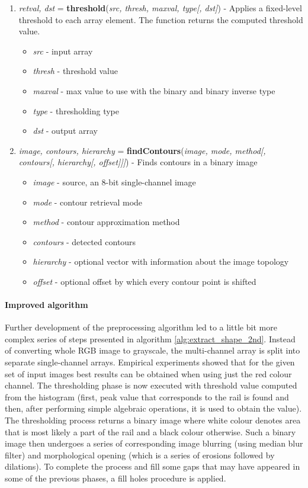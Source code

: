 \begin{enumerate}
	\item \textit{retval, dst} = \textbf{threshold}(\textit{src, thresh, maxval, type[, dst]}) - Applies a fixed-level threshold to each array element. The function returns the computed threshold value. \small{\begin{itemize}
		\item \textit{src} - input array
		\item \textit{thresh} - threshold value
		\item \textit{maxval} - max value to use with the binary and binary inverse type
		\item \textit{type} - thresholding type
		\item \textit{dst} - output array
	\end{itemize}}
	\item \textit{image, contours, hierarchy} = \textbf{findContours}(\textit{image, mode, method[, contours[, hierarchy[, offset]]]}) - Finds contours in a binary image \small{\begin{itemize}
		\item \textit{image} - source, an 8-bit single-channel image
		\item \textit{mode} - contour retrieval mode
		\item \textit{method} - contour approximation method
		\item \textit{contours} - detected contours
		\item \textit{hierarchy} - optional vector with information about the image topology
		\item \textit{offset} - optional offset by which every contour point is shifted
	\end{itemize}}
\end{enumerate}

\paragraph{Improved algorithm}
Further development of the preprocessing algorithm led to a little bit more complex series of steps presented in algorithm \ref{alg:extract_shape_2nd}. Instead of converting whole RGB image to grayscale, the multi-channel array is split into separate single-channel arrays. Empirical experiments showed that for the given set of input images best results can be obtained when using just the red colour channel. The thresholding phase is now executed with threshold value computed from the histogram (first, peak value that corresponds to the rail is found and then, after performing simple algebraic operations, it is used to obtain the value). The thresholding process returns a binary image where white colour denotes area that is most likely a part of the rail and a black colour otherwise. Such a binary image then undergoes a series of corresponding image blurring (using median blur filter) and morphological opening (which is a series of erosions followed by dilations). To complete the process and fill some gaps that may have appeared in some of the previous phases, a fill holes procedure is applied.

